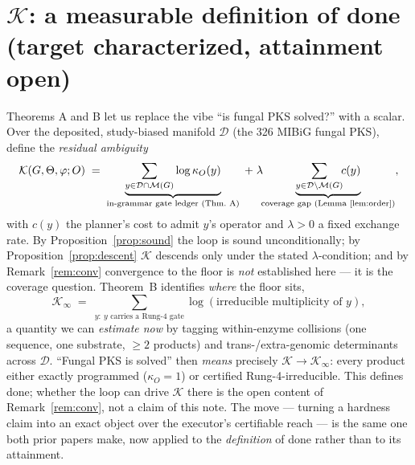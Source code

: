 \documentclass[11pt]{article}
\theoremstyle{plain}
\theoremstyle{definition}
\newcommand{\kO}{\kappa_{O}}
\newcommand{\Mset}{\mathcal{M}}
\newcommand{\Defn}[1]{\emph{#1}}
\begin{document}
\section{$\mathcal{K}$: a measurable definition of done (target characterized, attainment open)}
\label{sec:solved}
Theorems A and B let us replace the vibe ``is fungal PKS solved?'' with a scalar. Over the deposited, study-biased manifold $\mathcal{D}$ (the 326 MIBiG fungal PKS), define the \Defn{residual ambiguity}
\begin{equation}
\mathcal{K}(G,\Theta,\varphi;O)\;=\;\underbrace{\sum_{y\in\mathcal{D}\cap\Mset(G)}\log\kO(y)}_{\text{in-grammar gate ledger (Thm.~A)}}\;+\;\lambda\!\!\underbrace{\sum_{y\in\mathcal{D}\setminus\Mset(G)}\!\!c(y)}_{\text{coverage gap (Lemma~\ref{lem:order})}},
\label{eq:K}
\end{equation}
with $c(y)$ the planner's cost to admit $y$'s operator and $\lambda>0$ a fixed exchange rate. By Proposition~\ref{prop:sound} the loop is sound unconditionally; by Proposition~\ref{prop:descent} $\mathcal{K}$ descends only under the stated $\lambda$-condition; and by Remark~\ref{rem:conv} convergence to the floor is \emph{not} established here --- it is the coverage question. Theorem~B identifies \emph{where} the floor sits,
\[
\mathcal{K}_\infty\;=\;\sum_{y:\ \text{$y$ carries a Rung-4 gate}}\log(\text{irreducible multiplicity of }y),
\]
a quantity we can \emph{estimate now} by tagging within-enzyme collisions (one sequence, one substrate, $\geq 2$ products) and trans-/extra-genomic determinants across $\mathcal{D}$. ``Fungal PKS is solved'' then \emph{means} precisely $\mathcal{K}\!\to\!\mathcal{K}_\infty$: every product either exactly programmed ($\kO=1$) or certified Rung-4-irreducible. This defines done; whether the loop can drive $\mathcal{K}$ there is the open content of Remark~\ref{rem:conv}, not a claim of this note. The move --- turning a hardness claim into an exact object over the executor's certifiable reach --- is the same one both prior papers make, now applied to the \emph{definition} of done rather than to its attainment.
\end{document}
